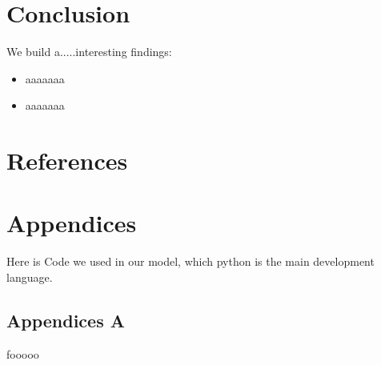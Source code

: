\documentclass[13pt]{ctexart} %
\begin{document}
\section{Conclusion}
We build a.....interesting findings:

\begin{itemize}
    \item aaaaaaa
    \item aaaaaaa
\end{itemize}

\newpage
\section*{References}
\fancyhf{}
\fancyhead[R]{ }
\fancyhead[L]{ }

\Large

\newpage
\section*{Appendices}
\fontsize{13pt}{12.5pt}\selectfont
Here is Code we used in our model, which python is the main development language.
\vspace{7pt}
\subsection*{Appendices A}
fooooo
\end{document}
